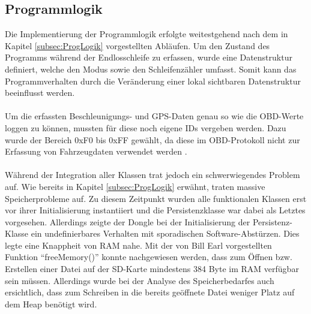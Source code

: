 \subsection{Programmlogik}
\label{subsec:intPl}
Die Implementierung der Programmlogik erfolgte weitestgehend nach dem in Kapitel \ref{subsec:ProgLogik} vorgestellten Abläufen. Um den Zustand des Programms während der Endlosschleife zu erfassen, wurde eine Datenstruktur definiert, welche den Modus sowie den Schleifenzähler umfasst. Somit kann das Programmverhalten durch die Veränderung einer lokal sichtbaren Datenstruktur beeinflusst werden.
\paragraph{}
Um die erfassten Beschleunigungs- und GPS-Daten genau so wie die OBD-Werte loggen zu können, mussten für diese noch eigene IDs vergeben werden. Dazu wurde der Bereich 0xF0 bis 0xFF gewählt, da diese im OBD-Protokoll nicht zur Erfassung von Fahrzeugdaten verwendet werden \cite{ISOobd}.
\paragraph{}
Während der Integration aller Klassen trat jedoch ein schwerwiegendes Problem auf. Wie bereits in Kapitel \ref{subsec:ProgLogik} erwähnt, traten massive Speicherprobleme auf. Zu diesem Zeitpunkt wurden alle funktionalen Klassen erst vor ihrer Initialisierung instantiiert und die Persistenzklasse war dabei als Letztes vorgesehen. Allerdings zeigte der Dongle bei der Initialisierung der Persistenz-Klasse ein undefinierbares Verhalten mit sporadischen Software-Abstürzen. Dies legte eine Knappheit von RAM nahe. Mit der von Bill Earl vorgestellten Funktion \enquote{freeMemory()} \cite{ardRAMcons} konnte nachgewiesen werden, dass zum Öffnen bzw. Erstellen einer Datei auf der SD-Karte mindestens 384 Byte im RAM verfügbar sein müssen. Allerdings wurde bei der Analyse des Speicherbedarfes auch ersichtlich, dass zum Schreiben in die bereits geöffnete Datei weniger Platz auf dem Heap benötigt wird.
